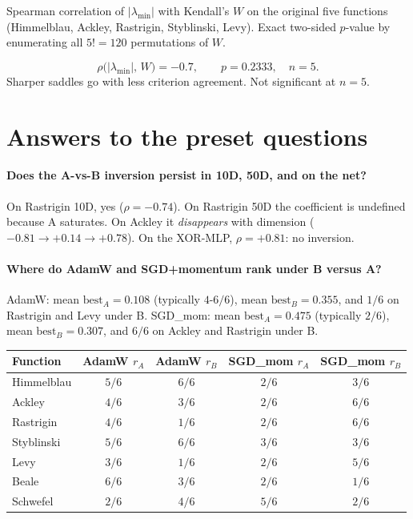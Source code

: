 \documentclass[11pt]{article}
\begin{document}
Spearman correlation of $|\lambda_{\min}|$ with Kendall's $W$ on the original
five functions (Himmelblau, Ackley, Rastrigin, Styblinski, Levy). Exact
two-sided $p$-value by enumerating all $5!=120$ permutations of $W$.

\[
\rho\bigl(|\lambda_{\min}|,\,W\bigr) = -0.7,\qquad p = 0.2333,\quad n=5.
\]
Sharper saddles go with less criterion agreement. Not significant at $n=5$.

\section{Answers to the preset questions}

\paragraph{Does the A-vs-B inversion persist in 10D, 50D, and on the net?}
On Rastrigin 10D, yes ($\rho=-0.74$). On Rastrigin 50D the coefficient is
undefined because A saturates. On Ackley it \emph{disappears} with dimension
($-0.81\to +0.14\to +0.78$). On the XOR-MLP, $\rho=+0.81$: no inversion.

\paragraph{Where do AdamW and SGD+momentum rank under B versus A?}
AdamW: mean $\mathrm{best}_A=0.108$ (typically $4$-$6/6$),
mean $\mathrm{best}_B=0.355$, and $1/6$ on Rastrigin and Levy under B.
SGD\_mom: mean $\mathrm{best}_A=0.475$ (typically $2/6$),
mean $\mathrm{best}_B=0.307$, and $6/6$ on Ackley and Rastrigin under B.

\begin{center}
\small
\begin{tabular}{lcccc}
\toprule
Function & AdamW $r_A$ & AdamW $r_B$ & SGD\_mom $r_A$ & SGD\_mom $r_B$ \\
\midrule
Himmelblau & $5/6$ & $6/6$ & $2/6$ & $3/6$ \\
Ackley     & $4/6$ & $3/6$ & $2/6$ & $6/6$ \\
Rastrigin  & $4/6$ & $1/6$ & $2/6$ & $6/6$ \\
Styblinski & $5/6$ & $6/6$ & $3/6$ & $3/6$ \\
Levy       & $3/6$ & $1/6$ & $2/6$ & $5/6$ \\
Beale      & $6/6$ & $3/6$ & $2/6$ & $1/6$ \\
Schwefel   & $2/6$ & $4/6$ & $5/6$ & $2/6$ \\
\bottomrule
\end{tabular}
\end{center}
\end{document}
